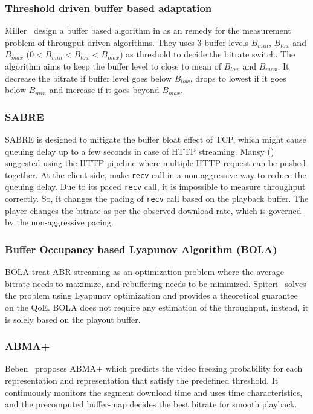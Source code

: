 \subsubsection{Threshold driven buffer based adaptation}
Miller \etal\ design a buffer based algorithm in \cite{6229732} as an remedy for the measurement problem of througput driven algorithms. They uses 3 buffer levels $B_{min}$, $B_{low}$ and $B_{max}$ ($0 < B_{min} < B_{low} < B_{max}$) as threshold to decide the bitrate switch. The algorithm aims to keep the buffer level to close to mean of $B_{low}$ and $B_{max}$. It decrease the bitrate if buffer level goes below $B_{low}$, drops to lowest if it goes below $B_{min}$ and increase if it goes beyond $B_{max}$.

\subsubsection{SABRE}
SABRE is designed to mitigate the buffer bloat effect of TCP, which might cause queuing delay up to a few seconds in case of HTTP streaming. Mansy \etal(\cite{10.1145/2483977.2484004}) suggested using the HTTP pipeline where multiple HTTP-request can be pushed together. At the client-side, make {\tt recv} call in a non-aggressive way to reduce the queuing delay. Due to its paced {\tt recv} call, it is impossible to measure throughput correctly. So, it changes the pacing of {\tt recv} call based on the playback buffer. The player changes the bitrate as per the observed download rate, which is governed by the non-aggressive pacing.

\subsubsection{Buffer Occupancy based Lyapunov Algorithm (BOLA)}
BOLA\cite{7524428} treat ABR streaming as an optimization problem where the average bitrate needs to maximize, and rebuffering needs to be minimized. Spiteri \etal\ solves the problem using Lyapunov optimization and provides a theoretical guarantee on the QoE. BOLA does not require any estimation of the throughput, instead, it is solely based on the playout buffer.

\subsubsection{ABMA+\cite{10.1145/2910017.2910596}}
Beben \etal\ proposes ABMA+\cite{10.1145/2910017.2910596} which predicts the video freezing probability for each representation and representation that satisfy the predefined threshold. It continuously monitors the segment download time and uses time characteristics, and the precomputed buffer-map decides the best bitrate for smooth playback.

